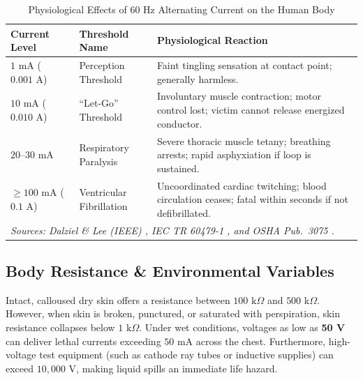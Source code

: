 \begin{table}[htbp]
    \centering
    \caption{Physiological Effects of 60 Hz Alternating Current on the Human Body}
    \label{tab:shock_thresholds}
    \begin{tabularx}{\textwidth}{p{2.8cm} p{4.2cm} X}
        \toprule
        \textbf{Current Level} & \textbf{Threshold Name} & \textbf{Physiological Reaction} \\
        \midrule
        $1\text{ mA}$ ($0.001\text{ A}$) & Perception Threshold & Faint tingling sensation at contact point; generally harmless. \\
        $10\text{ mA}$ ($0.010\text{ A}$) & ``Let-Go'' Threshold & Involuntary muscle contraction; motor control lost; victim cannot release energized conductor. \\
        $20\text{--}30\text{ mA}$ & Respiratory Paralysis & Severe thoracic muscle tetany; breathing arrests; rapid asphyxiation if loop is sustained. \\
        $\ge 100\text{ mA}$ ($0.1\text{ A}$) & Ventricular Fibrillation & Uncoordinated cardiac twitching; blood circulation ceases; fatal within seconds if not defibrillated. \\
        \midrule
        \multicolumn{3}{l}{\footnotesize\textit{Sources: Dalziel \& Lee (IEEE) \cite{dalziel1968lethal}, IEC TR 60479-1 \cite{iec60479_1}, and OSHA Pub.~3075 \cite{osha3075}.}} \\
        \bottomrule
    \end{tabularx}
\end{table}
\subsection{Body Resistance \& Environmental Variables}
Intact, calloused dry skin offers a resistance between $100\text{ k}\Omega$ and $500\text{ k}\Omega$. However, when skin is broken, punctured, or saturated with perspiration, skin resistance collapses below $1\text{ k}\Omega$. Under wet conditions, voltages as low as \textbf{50 V} can deliver lethal currents exceeding $50\text{ mA}$ across the chest. Furthermore, high-voltage test equipment (such as cathode ray tubes or inductive supplies) can exceed $10{,}000\text{ V}$, making liquid spills an immediate life hazard.

